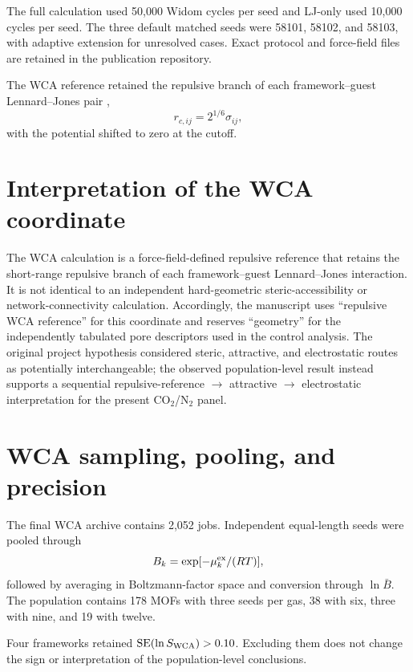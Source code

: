 \documentclass[11pt,a4paper]{article}
\begin{document}
The full calculation used 50,000 Widom cycles per seed and LJ-only used 10,000 cycles per seed. The three default matched seeds were 58101, 58102, and 58103, with adaptive extension for unresolved cases. Exact protocol and force-field files are retained in the publication repository.

The WCA reference retained the repulsive branch of each framework--guest Lennard--Jones pair \cite{weeks1971wca},
\begin{equation}
r_{c,ij}=2^{1/6}\sigma_{ij},
\end{equation}
with the potential shifted to zero at the cutoff.

\section{Interpretation of the WCA coordinate}

The WCA calculation is a force-field-defined repulsive reference that retains the short-range repulsive branch of each framework--guest Lennard--Jones interaction. It is not identical to an independent hard-geometric steric-accessibility or network-connectivity calculation. Accordingly, the manuscript uses ``repulsive WCA reference'' for this coordinate and reserves ``geometry'' for the independently tabulated pore descriptors used in the control analysis. The original project hypothesis considered steric, attractive, and electrostatic routes as potentially interchangeable; the observed population-level result instead supports a sequential repulsive-reference $\rightarrow$ attractive $\rightarrow$ electrostatic interpretation for the present CO$_2$/N$_2$ panel.

\section{WCA sampling, pooling, and precision}

The final WCA archive contains 2,052 jobs. Independent equal-length seeds were pooled through
\begin{equation}
B_k=\exp[-\mu_k^{\rm ex}/(RT)],
\end{equation}
followed by averaging in Boltzmann-factor space and conversion through $\ln\bar B$. The population contains 178 MOFs with three seeds per gas, 38 with six, three with nine, and 19 with twelve.

Four frameworks retained $\mathrm{SE}(\ln S_{\rm WCA})>0.10$. Excluding them does not change the sign or interpretation of the population-level conclusions.
\end{document}
